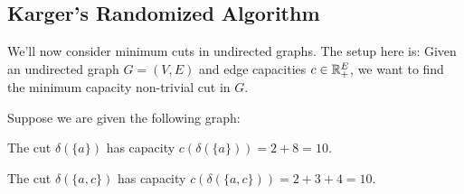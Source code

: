 \subsection{Karger's Randomized Algorithm}
We'll now consider minimum cuts in undirected graphs.
The setup here is: Given an undirected graph $G = (V, E)$ and edge capacities $c \in \mathbb{R}_+^E$, we want to find the minimum capacity non-trivial cut in $G$.

\begin{example}{}{}
    Suppose we are given the following graph:

    \begin{minipage}{\textwidth}
        \centering
    \end{minipage}

    The cut $\delta(\{a\})$ has capacity $c(\delta(\{a\})) = 2 + 8 = 10$.

    The cut $\delta(\{a, c\})$ has capacity $c(\delta(\{a, c\})) = 2 + 3 + 4 = 10$.
\end{example}

